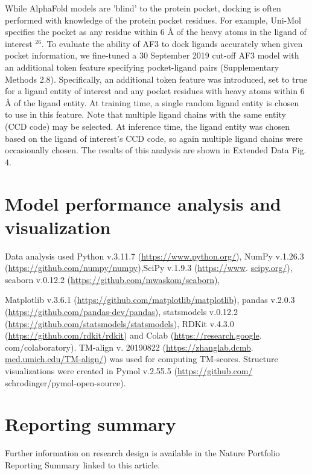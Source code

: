 \documentclass[10pt]{article}
\begin{document}
While AlphaFold models are 'blind' to the protein pocket, docking is often performed with knowledge of the protein pocket residues. For example, Uni-Mol specifies the pocket as any residue within 6 Å of the heavy atoms in the ligand of interest ${ }^{26}$. To evaluate the ability of AF3 to dock ligands accurately when given pocket information, we fine-tuned a 30 September 2019 cut-off AF3 model with an additional token feature specifying pocket-ligand pairs (Supplementary Methods 2.8). Specifically, an additional token feature was introduced, set to true for a ligand entity of interest and any pocket residues with heavy atoms within 6 Å of the ligand entity. At training time, a single random ligand entity is chosen to use in this feature. Note that multiple ligand chains with the same entity (CCD code) may be selected. At inference time, the ligand entity was chosen based on the ligand of interest's CCD code, so again multiple ligand chains were occasionally chosen. The results of this analysis are shown in Extended Data Fig. 4.

\section*{Model performance analysis and visualization}
Data analysis used Python v.3.11.7 (\href{https://www.python.org/}{https://www.python.org/}), NumPy v.1.26.3 (\href{https://github.com/numpy/numpy}{https://github.com/numpy/numpy}),SciPy v.1.9.3 (\href{https://www}{https://www}. \href{http://scipy.org/}{scipy.org/}), seaborn v.0.12.2 (\href{https://github.com/mwaskom/seaborn}{https://github.com/mwaskom/seaborn}),

Matplotlib v.3.6.1 (\href{https://github.com/matplotlib/matplotlib}{https://github.com/matplotlib/matplotlib}), pandas v.2.0.3 (\href{https://github.com/pandas-dev/pandas}{https://github.com/pandas-dev/pandas}), statsmodels v.0.12.2 (\href{https://github.com/statsmodels/statsmodels}{https://github.com/statsmodels/statsmodels}), RDKit v.4.3.0 (\href{https://github.com/rdkit/rdkit}{https://github.com/rdkit/rdkit}) and Colab (\href{https://research.google}{https://research.google}. com/colaboratory). TM-align v. 20190822 (\href{https://zhanglab.dcmb}{https://zhanglab.dcmb}. \href{http://med.umich.edu/TM-align/}{med.umich.edu/TM-align/}) was used for computing TM-scores. Structure visualizations were created in Pymol v.2.55.5 (\href{https://github.com/}{https://github.com/} schrodinger/pymol-open-source).

\section*{Reporting summary}
Further information on research design is available in the Nature Portfolio Reporting Summary linked to this article.
\end{document}
